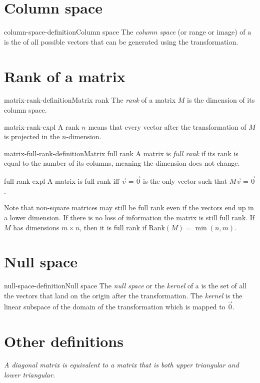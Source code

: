 \documentclass[preview]{standalone}
\begin{document}
\section{Column space}

\begin{snippetdefinition}{column-space-definition}{Column space}
    The \textit{column space} (or range or image) of a \matrix is the
    \set of all possible vectors that can be generated using the transformation.
\end{snippetdefinition}

\section{Rank of a matrix}

\begin{snippetdefinition}{matrix-rank-definition}{Matrix rank}
    The \textit{rank} of a matrix \(M\) is the dimension of its column space.
\end{snippetdefinition}

\begin{snippet}{matrix-rank-expl}
    A rank \(n\) means that every vector after the transformation of \(M\)
    is projected in the \(n\)-dimension.
\end{snippet}

\begin{snippetdefinition}{matrix-full-rank-definition}{Matrix full rank}
    A matrix is \textit{full rank} if its rank is equal to the number of its columns, meaning
    the dimension does not change.
\end{snippetdefinition}

\begin{snippet}{full-rank-expl}
    A matrix is full rank iff \(\vec{v}=\vec{0}\) is the only vector such that \(M\vec{v}=\vec{0}\).
    
    Note that non-square matrices may still be full rank even if the vectors end up in a lower dimension.
    If there is no loss of information the matrix is still full rank.
    If \(M\) has dimensions \(m \times n\), then it is full rank if \(\text{Rank}(M)=\min(n,m)\).
\end{snippet}

\section{Null space}

\begin{snippetdefinition}{null-space-definition}{Null space}
    The \textit{null space} or the \textit{kernel} of a \matrix is the set of all the vectors that land on the origin
    after the transformation.
    The \textit{kernel} is the linear subspace of the domain of the transformation which is mapped to \(\vec{0}\).
\end{snippetdefinition}

\section{Other definitions}


\textit{A diagonal matrix is equivalent to a matrix that is both upper triangular and lower triangular.}
\end{document}
